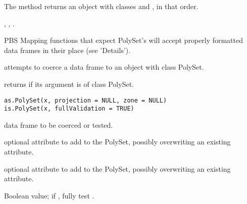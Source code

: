 \documentclass[letterpaper]{book}
\begin{document}
%
\begin{Value}
The  method returns an object with classes
 and , in that order.
\end{Value}
%
\begin{SeeAlso}\relax
{},
,
.
\end{SeeAlso}
%
\begin{Description}\relax
PBS Mapping functions that expect PolySet's will accept properly
formatted data frames in their place (see 'Details').

 attempts to coerce a data frame to an object with
class PolySet.

 returns  if its argument is of class
PolySet.
\end{Description}
%
\begin{Usage}
\begin{verbatim}
as.PolySet(x, projection = NULL, zone = NULL)
is.PolySet(x, fullValidation = TRUE)
\end{verbatim}
\end{Usage}
%
\begin{Arguments}
\begin{ldescription}
\item[\code{x}] data frame to be coerced or tested.
\item[\code{projection}] optional  attribute to add to
the PolySet, possibly overwriting an existing attribute.
\item[\code{zone}] optional  attribute to add to the PolySet,
possibly overwriting an existing attribute.
\item[\code{fullValidation}] Boolean value; if , fully test
.
\end{ldescription}
\end{Arguments}
%
\end{document}
